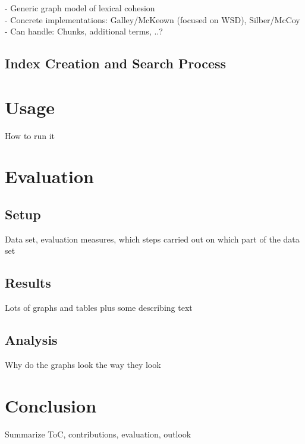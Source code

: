 \documentclass[11pt, a4paper, abstraction]{scrartcl}
\begin{document}
- Generic graph model of lexical cohesion \\
- Concrete implementations: Galley/McKeown (focused on WSD), Silber/McCoy \\
- Can handle: Chunks, additional terms, ..? 

\subsection{Index Creation and Search Process}

\section{Usage}

How to run it

\section{Evaluation}

\subsection{Setup}

Data set, evaluation measures, which steps carried out on which part of the data set

\subsection{Results}

Lots of graphs and tables plus some describing text

\subsection{Analysis}

Why do the graphs look the way they look

\section{Conclusion}

Summarize ToC, contributions, evaluation, outlook
\end{document}
